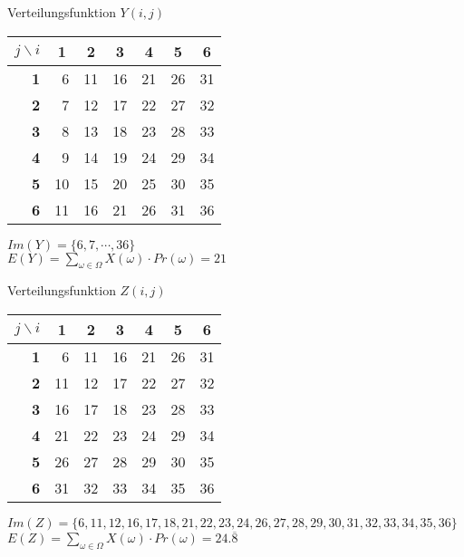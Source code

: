 \documentclass[a4paper]{scrartcl}
\begin{document}
\begin{flushleft}
		\begin{center}
		Verteilungsfunktion $Y(i,j)$\\
		\begin{tabular}{|r|r|r|r|r|r|r|}
		\hline
		\multicolumn{1}{|c|}{$j\backslash i$} & \multicolumn{1}{c|}{\textbf{1}} & \multicolumn{1}{c|}{\textbf{2}} & \multicolumn{1}{c|}{\textbf{3}} & \multicolumn{1}{c|}{\textbf{4}} & \multicolumn{1}{c|}{\textbf{5}} & \multicolumn{1}{c|}{\textbf{6}} \\ \hline
		\textbf{1} & 6  & 11 & 16 & 21 & 26 & 31 \\ \hline
		\textbf{2} & 7  & 12 & 17 & 22 & 27 & 32 \\ \hline
		\textbf{3} & 8  & 13 & 18 & 23 & 28 & 33 \\ \hline
		\textbf{4} & 9  & 14 & 19 & 24 & 29 & 34 \\ \hline
		\textbf{5} & 10 & 15 & 20 & 25 & 30 & 35 \\ \hline
		\textbf{6} & 11 & 16 & 21 & 26 & 31 & 36 \\ \hline
		\end{tabular}
		\end{center}
		$Im(Y)=\{6,7,\cdots,36\}$\\
		$E(Y)=\sum\limits_{\omega\in\Omega} X(\omega)\cdot Pr(\omega) = 21$\\[1em]

		\begin{center}
		Verteilungsfunktion $Z(i,j)$\\
		\begin{tabular}{|r|r|r|r|r|r|r|}
		\hline
		\multicolumn{1}{|c|}{$j\backslash i$} & \multicolumn{1}{c|}{\textbf{1}} & \multicolumn{1}{c|}{\textbf{2}} & \multicolumn{1}{c|}{\textbf{3}} & \multicolumn{1}{c|}{\textbf{4}} & \multicolumn{1}{c|}{\textbf{5}} & \multicolumn{1}{c|}{\textbf{6}} \\ \hline
		\textbf{1} & 6   & 11 & 16 & 21 & 26 & 31 \\ \hline
		\textbf{2} & 11  & 12 & 17 & 22 & 27 & 32 \\ \hline
		\textbf{3} & 16  & 17 & 18 & 23 & 28 & 33 \\ \hline
		\textbf{4} & 21  & 22 & 23 & 24 & 29 & 34 \\ \hline
		\textbf{5} & 26  & 27 & 28 & 29 & 30 & 35 \\ \hline
		\textbf{6} & 31  & 32 & 33 & 34 & 35 & 36 \\ \hline
		\end{tabular}
		\end{center}
		$Im(Z)=\{6,11,12,16,17,18,21,22,23,24,26,27,28,29,30,31,32,33,34,35,36\}$\\
		$E(Z)=\sum\limits_{\omega\in\Omega} X(\omega)\cdot Pr(\omega) = 24.\overline{8}$\\[1em]
		
	\end{flushleft}
\end{document}

